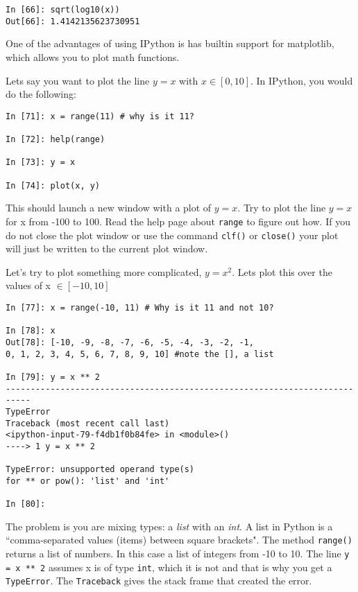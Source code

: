 \documentclass[12pt]{article}
\begin{document}
\begin{lstlisting}[style=bash]
In [66]: sqrt(log10(x))
Out[66]: 1.4142135623730951
\end{lstlisting}

One of the advantages of using IPython is has builtin support for matplotlib, which allows you to plot math functions.

Lets say you want to plot the line $y = x$ with $x \in [0, 10]$. In IPython, you would do the following:

\begin{lstlisting}[style=bash]
In [71]: x = range(11) # why is it 11?

In [72]: help(range)

In [73]: y = x

In [74]: plot(x, y)
\end{lstlisting}

This should launch a new window with a plot of $y = x$. Try to plot the line $y = x$ for x from -100 to 100. Read the help page about \texttt{range} to figure out how. If you do not close the plot window or use the command \texttt{clf()} or \texttt{close()} your plot will just be written to the current plot window.

Let's try to plot something more complicated, $y = x^2$. Lets plot this over the values of x $\in[-10, 10]$

\begin{lstlisting}[style=bash]
In [77]: x = range(-10, 11) # Why is it 11 and not 10?

In [78]: x
Out[78]: [-10, -9, -8, -7, -6, -5, -4, -3, -2, -1, 
0, 1, 2, 3, 4, 5, 6, 7, 8, 9, 10] #note the [], a list

In [79]: y = x ** 2
---------------------------------------------------------------------------
TypeError                                 
Traceback (most recent call last)
<ipython-input-79-f4db1f0b84fe> in <module>()
----> 1 y = x ** 2

TypeError: unsupported operand type(s) 
for ** or pow(): 'list' and 'int'

In [80]:
\end{lstlisting}

The problem is you are mixing types: a \emph{list} with an \emph{int}. A list in Python is a ``comma-separated values (items) between square brackets". The method \texttt{range()} returns a list of numbers. In this case a list of integers from -10 to 10. The line \texttt{y = x ** 2} assumes x is of type \texttt{int}, which it is not and that is why you get a \texttt{TypeError}. The \texttt{Traceback} gives the stack frame that created the error.
\end{document}
